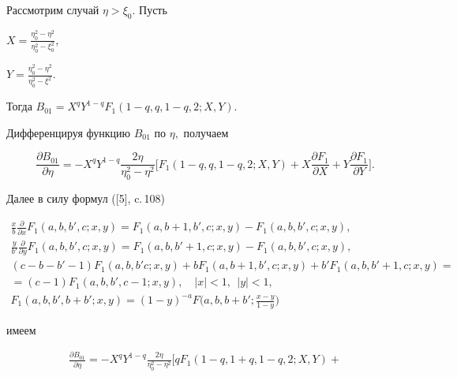 \begin{pf}


Рассмотрим случай $\eta>\xi_0$. Пусть


$X=\frac{\eta_0^2-\eta^2}{\eta_0^2-\xi_0^2}$,


$Y=\frac{\eta_0^2-\eta^2}{\eta_0^2-\xi^2}$.


Тогда $B_{01}=X^qY^{1-q} F_1(1-q,q,1-q,2;X,Y)$. 


Дифференцируя функцию $B_{01}$ по $\eta, $ получаем


$$


\frac{\partial B_{01}}{\partial \eta}=-X^q Y^{1-q} \frac{2\eta}


{\eta_0^2-\eta^2}


\bigg[ F_1(1-q,q,1-q,2;X,Y)+X \frac{\partial F_1}{\partial X}


+Y\frac{\partial F_1}{\partial Y}\bigg].


$$


Далее в силу формул ([5], c.\,108)


\begin{gather*}


\frac{x}{b}\frac{\partial }{\partial x}F_1(a,b,b',c;x,y)=


F_1(a,b+1,b',c;x,y)-F_1(a,b,b',c;x,y), \\


%


\frac{y}{b'}\frac{\partial }{\partial y}F_1(a,b,b',c;x,y)=


F_1(a,b,b'+1,c;x,y)-F_1(a,b,b',c;x,y), \\


%


(c-b-b'-1)F_1(a,b,b'c;x,y)+bF_1(a,b+1,b',c;x,y)+


b'F_1(a,b,b'+1,c;x,y)= \\


%


=(c-1)F_1(a,b,b',c-1;x,y),\quad |x|<1, \ \ |y|<1,\\


F_1(a,b,b',b+b';x,y)=(1-y)^{-a} F\bigg(a,b,b+b';\frac{x-y}{1-y}\bigg)


\end{gather*}


имеем


\begin{gather*}


\frac{\partial B_{01}}{\partial \eta}=-X^q Y^{1-q} \frac{2\eta}


{\eta_0^2-\eta^2} [q F_1(1-q,1+q,1-q,2;X,Y)+



\end{gather*}
\end{pf}
